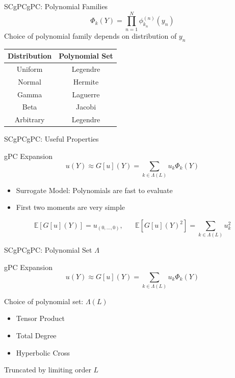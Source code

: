 \documentclass{beamer}
\newcommand{\expv}[1]{\ensuremath{\mathbb{E}[ #1]}}
\begin{document}
\begin{frame}{SCgPC}{gPC: Polynomial Families}\vspace{-20pt}
  \vfill
  \[\Phi_k(Y) = \prod_{n=1}^N \phi^{(n)}_{k_n}(y_n)\]
  \vfill
  Choice of polynomial family depends on distribution of $y_n$
  \vfill
  \begin{table}[h!]
    \centering
    \begin{tabular}{c c}
      Distribution & Polynomial Set \\ \hline
      Uniform & Legendre \\
      Normal & Hermite \\
      Gamma & Laguerre \\
      Beta & Jacobi \\ \hline
      Arbitrary & Legendre
    \end{tabular}
  \end{table}
  \vfill
\end{frame}



\begin{frame}{SCgPC}{gPC: Useful Properties}\vspace{-20pt}
  \begin{block}{gPC Expansion}
    \[u(Y) \approx G[u](Y) = \sum_{k\in\Lambda(L)} u_k \Phi_k(Y)\]
  \end{block}
  \vfill
  \begin{itemize}
    \item Surrogate Model: Polynomials are fast to evaluate
  \vfill
    \item First two moments are very simple
  \end{itemize}
  \vfill
  \begin{equation*}
    \expv{G[u](Y)} = u_{(0,\ldots,0)},\hspace{20pt}\expv{G[u](Y)^2} = \sum_{k\in\Lambda(L)} u_k^2
  \end{equation*}
  \vfill
\end{frame}




\begin{frame}{SCgPC}{gPC: Polynomial Set $\Lambda$}\vspace{-10pt}
  \begin{block}{gPC Expansion}
    \[u(Y) \approx G[u](Y) = \sum_{k\in\Lambda(L)} u_k \Phi_k(Y)\]
  \end{block}
  \vfill
      Choice of polynomial set: $\Lambda(L)$
      \begin{itemize}
        \item Tensor Product
        \item Total Degree
        \item Hyperbolic Cross
      \end{itemize}
      \vfill
      Truncated by limiting order $L$
  \vfill
\end{frame}
\end{document}

